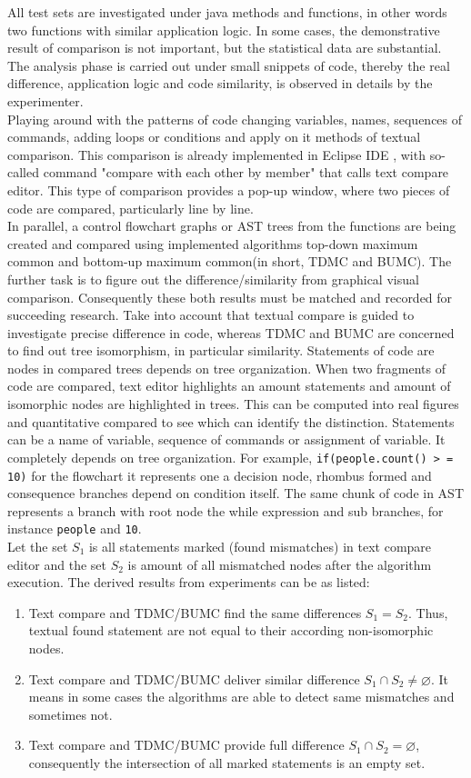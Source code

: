 \documentclass{report}
\begin{document}
All test sets are investigated under java methods and functions, in other words two functions with similar application logic. In some cases, the demonstrative result of comparison is not important, but the statistical data are substantial. The analysis phase is carried out under small snippets of code, thereby the real difference, application logic and code similarity, is observed in details by the experimenter. 
\\
Playing around with the patterns of code changing variables, names, sequences of commands, adding loops or conditions and apply on it methods of textual comparison. This comparison is already implemented in Eclipse IDE \cite{eclipse_site}, with so-called command "compare with each other by member" that calls text compare editor. This type of comparison provides a pop-up window, where two pieces of code are compared, particularly line by line.
\\
In parallel, a control flowchart graphs or AST trees from the functions are being created and compared using implemented algorithms top-down maximum common and bottom-up maximum common(in short, TDMC and BUMC). The further task is to figure out the difference/similarity from graphical visual comparison. Consequently these both results must be matched and recorded for succeeding research. Take into account that textual compare is guided to investigate precise difference in code, whereas TDMC and BUMC are concerned to find out tree isomorphism, in particular similarity. Statements of code are nodes in compared trees depends on tree organization. When two fragments of code are compared, text editor highlights an amount statements and amount of isomorphic nodes are highlighted in trees. This can be computed into real figures and quantitative compared to see which can identify the distinction. Statements can be a name of variable, sequence of commands or assignment of variable. It completely depends on tree organization. For example, \texttt{if(people.count() > = 10)} for the flowchart it represents one a decision node, rhombus formed and consequence branches depend on condition itself. The same chunk of code in AST represents a branch with root node the while expression and sub branches, for instance \texttt{people} and \texttt{10}.
\\
Let the set $S_{1}$ is all statements marked (found mismatches) in text compare editor and the set $S_{2}$ is amount of all mismatched nodes after the algorithm execution.
The derived results from experiments can be as listed: 
\begin{enumerate}
  \item Text compare and TDMC/BUMC find the same differences $S_{1} = S_{2} $. Thus, textual found statement are not equal to their according non-isomorphic nodes.
  \item Text compare and TDMC/BUMC deliver similar difference $S_{1} \cap S_{2} \neq \varnothing $. It means in some cases the algorithms are able to detect same mismatches and sometimes not.
  \item Text compare and TDMC/BUMC provide full difference $S_{1} \cap S_{2} = \varnothing $, consequently the intersection of all marked statements is an empty set.
\end{enumerate}
\end{document}
